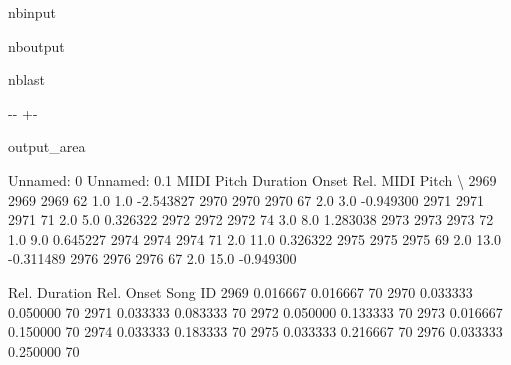 \documentclass[letterpaper,10pt,english]{sphinxmanual}
\newlength\nbsphinxcodecellspacing
\begin{document}
\begin{sphinxuseclass}{nbinput}
{
\begin{sphinxVerbatim}[commandchars=\\\{\}]
\llap{\color{nbsphinxin}[69]:\,\hspace{\fboxrule}\hspace{\fboxsep}}\PYG{p}{[} \PYG{p}{[}\PYG{p}{]}  \PYG{p}{]}
\end{sphinxVerbatim}
}

\end{sphinxuseclass}
\begin{sphinxuseclass}{nboutput}
\begin{sphinxuseclass}{nblast}
{

\kern-\sphinxverbatimsmallskipamount\kern-\baselineskip
\kern+\FrameHeightAdjust\kern-\fboxrule
\vspace{\nbsphinxcodecellspacing}

\begin{sphinxuseclass}{output_area}
\begin{sphinxuseclass}{}


\begin{sphinxVerbatim}[commandchars=\\\{\}]
\llap{\color{nbsphinxout}[69]:\,\hspace{\fboxrule}\hspace{\fboxsep}}      Unnamed: 0  Unnamed: 0.1  MIDI Pitch  Duration  Onset  Rel. MIDI Pitch  \textbackslash{}
2969        2969          2969          62       1.0    1.0        -2.543827
2970        2970          2970          67       2.0    3.0        -0.949300
2971        2971          2971          71       2.0    5.0         0.326322
2972        2972          2972          74       3.0    8.0         1.283038
2973        2973          2973          72       1.0    9.0         0.645227
2974        2974          2974          71       2.0   11.0         0.326322
2975        2975          2975          69       2.0   13.0        -0.311489
2976        2976          2976          67       2.0   15.0        -0.949300

      Rel. Duration  Rel. Onset  Song ID
2969       0.016667    0.016667       70
2970       0.033333    0.050000       70
2971       0.033333    0.083333       70
2972       0.050000    0.133333       70
2973       0.016667    0.150000       70
2974       0.033333    0.183333       70
2975       0.033333    0.216667       70
2976       0.033333    0.250000       70
\end{sphinxVerbatim}



\end{sphinxuseclass}
\end{sphinxuseclass}
}

\end{sphinxuseclass}
\end{sphinxuseclass}
\end{document}
